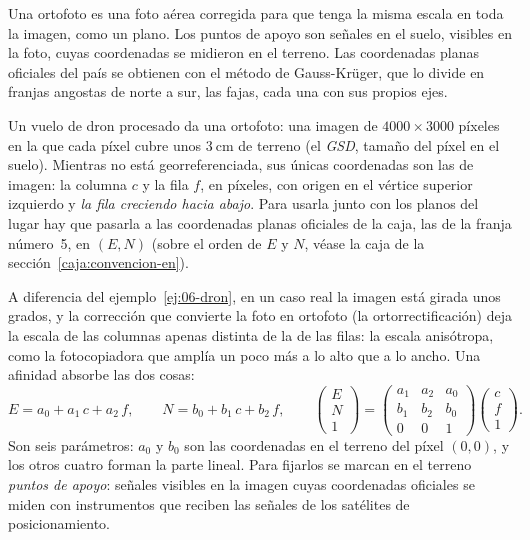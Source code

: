 \begin{idea}
Una ortofoto es una foto aérea corregida para que tenga la misma escala en toda la imagen, como
un plano. Los puntos de apoyo son señales en el suelo, visibles en la foto, cuyas coordenadas se
midieron en el terreno. Las coordenadas planas oficiales del país se obtienen con el método de
Gauss-Krüger, que lo divide en franjas angostas de norte a sur, las fajas, cada una con sus
propios ejes.
\end{idea}

Un vuelo de dron procesado da una ortofoto: una imagen de \(4000\times3000\) píxeles en la que
cada píxel cubre unos \(3\ \mathrm{cm}\) de terreno (el \emph{GSD}, tamaño del píxel en el
suelo). Mientras no está georreferenciada, sus únicas coordenadas son las de imagen: la
columna \(c\) y la fila \(f\), en píxeles, con origen en el vértice superior izquierdo y
\emph{la fila creciendo hacia abajo}. Para usarla junto con los planos del lugar hay que pasarla
a las coordenadas planas oficiales de la caja, las de la franja número~5, en \((E,N)\) (sobre el
orden de \(E\) y \(N\), véase la caja de la sección~\ref{caja:convencion-en}).

A diferencia del ejemplo~\ref{ej:06-dron}, en un caso real la imagen está girada unos grados,
y la corrección que convierte la foto en ortofoto (la ortorrectificación) deja la escala de las
columnas apenas distinta de la de las filas: la escala anisótropa, como la fotocopiadora que
amplía un poco más a lo alto que a lo ancho. Una afinidad absorbe las dos cosas:
\[
  \boxed{E=a_0+a_1\,c+a_2\,f,\qquad N=b_0+b_1\,c+b_2\,f,}
  \qquad
  \begin{pmatrix}E\\N\\1\end{pmatrix}
  =\begin{pmatrix}a_1&a_2&a_0\\ b_1&b_2&b_0\\ 0&0&1\end{pmatrix}
   \begin{pmatrix}c\\f\\1\end{pmatrix}.
\]
Son seis parámetros: \(a_0\) y \(b_0\) son las coordenadas en el terreno del píxel \((0,0)\), y
los otros cuatro forman la parte lineal. Para fijarlos se marcan en el terreno \emph{puntos de
apoyo}: señales visibles en la imagen cuyas coordenadas oficiales se miden con instrumentos que
reciben las señales de los satélites de posicionamiento.

